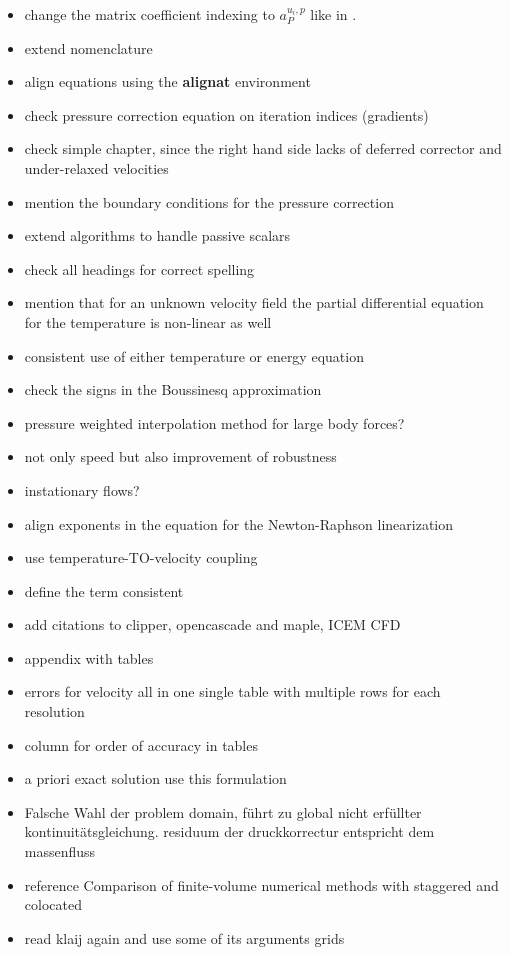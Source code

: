 \documentclass[article,type=msc,colorback,accentcolor=tud2a]{tudthesis}
\begin{document}
  \begin{itemize}
    \item change the matrix coefficient indexing to \(a_P^{u_i,p}\) like in \cite{darwish09}.
    \item extend nomenclature
    \item align equations using the \textbf{alignat} environment
    \item check pressure correction equation on iteration indices (gradients)
    \item check simple chapter, since the right hand side lacks of deferred corrector and under-relaxed velocities
    \item mention the boundary conditions for the pressure correction
    \item extend algorithms to handle passive scalars
    \item check all headings for correct spelling
    \item mention that for an unknown velocity field the partial differential equation for the temperature is non-linear as well
    \item consistent use of either temperature or energy equation
    \item check the signs in the Boussinesq approximation
    \item pressure weighted interpolation method for large body forces?
    \item not only speed but also improvement of robustness
    \item instationary flows?
    \item align exponents in the equation for the Newton-Raphson linearization
    \item use temperature-TO-velocity coupling
    \item define the term consistent
    \item add citations to clipper, opencascade and maple, ICEM CFD
    \item appendix with tables
    \item errors for velocity all in one single table with multiple rows for each resolution
    \item column for order of accuracy in tables 
    \item a priori exact solution use this formulation
    \item Falsche Wahl der problem domain, führt zu global nicht erfüllter kontinuitätsgleichung. residuum der druckkorrectur entspricht dem massenfluss
    \item reference Comparison of finite-volume numerical methods with staggered and colocated
    \item read klaij again and use some of its arguments
      grids
  \end{itemize}
\end{document}

